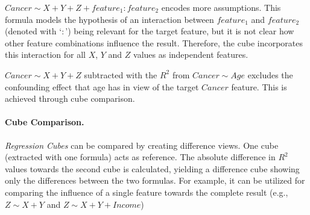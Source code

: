 \documentclass[journal]{style/vgtc} 			          %
\begin{document}
$Cancer \sim X + Y + Z + feature_1:feature_2$ encodes more assumptions.
This formula models the hypothesis of an interaction between $feature_1$ and $feature_2$ (denoted with `$:$') being relevant for the target feature, but it is not clear how other feature combinations influence the result.
Therefore, the cube incorporates this interaction for all $X$, $Y$ and $Z$ values as independent features.

$Cancer \sim X + Y + Z$ subtracted with the $R^2$ from $Cancer \sim Age$ excludes the confounding effect that age has in view of the target $Cancer$ feature.
This is achieved through cube comparison.

\paragraph{Cube Comparison.}
\emph{Regression Cubes} can be compared by creating difference views.
One cube (extracted with one formula) acts as reference.
The absolute difference in $R^2$ values towards the second cube is calculated, yielding a difference cube showing only the differences between the two formulas.
For example, it can be utilized for comparing the influence of a single feature towards the complete result (e.g., $Z \sim X + Y$ and $Z \sim X + Y + Income$)
%
\end{document}
